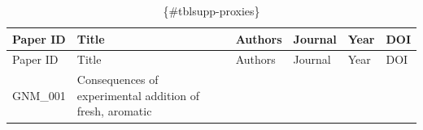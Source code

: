 \documentclass[
  number,
  review,
  onecolumn]{elsarticle}
\begin{document}
\begin{longtable}[]{@{}
  >{\raggedright\arraybackslash}p{}
  >{\raggedright\arraybackslash}p{}
  >{\raggedright\arraybackslash}p{}
  >{\raggedright\arraybackslash}p{}
  >{\raggedleft\arraybackslash}p{}
  >{\raggedright\arraybackslash}p{}@{}}
\caption{ \{\#tblsupp-proxies\}}\tabularnewline
\toprule\noalign{}
\begin{minipage}[b]{\linewidth}\raggedright
Paper ID
\end{minipage} & \begin{minipage}[b]{\linewidth}\raggedright
Title
\end{minipage} & \begin{minipage}[b]{\linewidth}\raggedright
Authors
\end{minipage} & \begin{minipage}[b]{\linewidth}\raggedright
Journal
\end{minipage} & \begin{minipage}[b]{\linewidth}\raggedleft
Year
\end{minipage} & \begin{minipage}[b]{\linewidth}\raggedright
DOI
\end{minipage} \\
\midrule\noalign{}
\endfirsthead
\toprule\noalign{}
\begin{minipage}[b]{\linewidth}\raggedright
Paper ID
\end{minipage} & \begin{minipage}[b]{\linewidth}\raggedright
Title
\end{minipage} & \begin{minipage}[b]{\linewidth}\raggedright
Authors
\end{minipage} & \begin{minipage}[b]{\linewidth}\raggedright
Journal
\end{minipage} & \begin{minipage}[b]{\linewidth}\raggedleft
Year
\end{minipage} & \begin{minipage}[b]{\linewidth}\raggedright
DOI
\end{minipage} \\
\midrule\noalign{}
\endhead
\bottomrule\noalign{}
\endlastfoot
GNM\_001 & Consequences of experimental addition of fresh, aromatic

\end{longtable}
\end{document}

